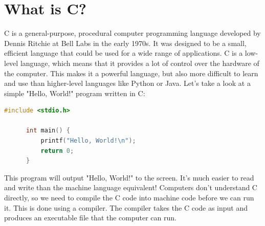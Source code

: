 \documentclass[12pt, openany]{book}
\begin{document}
  \section{What is C?}
  C is a general-purpose, procedural computer programming language developed by Dennis Ritchie at Bell Labs in the early 1970s. It was designed to be a small, efficient language that could be used for a wide range of applications. C is a low-level language, which means that it provides a lot of control over the hardware of the computer. This makes it a powerful language, but also more difficult to learn and use than higher-level languages like Python or Java. Let's take a look at a simple "Hello, World!" program written in C:
  \begin{lstlisting}[language=C, caption=Hello World in C]
      #include <stdio.h>
      
      int main() {
          printf("Hello, World!\n");
          return 0;
      }
  \end{lstlisting}
  \noindent This program will output "Hello, World!" to the screen. It's much easier to read and write than the machine language equivalent! Computers don't understand C directly, so we need to compile the C code into machine code before we can run it. This is done using a compiler. The compiler takes the C code as input and produces an executable file that the computer can run.
  
\end{document}

